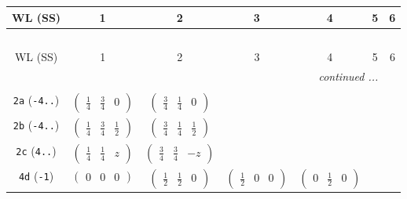 \documentclass[fleqn,9pt,landscape]{jsarticle}
\begin{document}
\begin{center}
\renewcommand{\arraystretch}{1.2}
\begin{longtable}{ccccccc}
 \hline \hline
WL (SS) & 1 & 2 & 3 & 4 & 5 & 6 \\ \hline \endfirsthead

\multicolumn{6}{l}{\tablename\ \thetable{}} \\
 \hline \hline
WL (SS) & 1 & 2 & 3 & 4 & 5 & 6 \\ \hline \endhead

 \hline \hline
\multicolumn{6}{r}{\footnotesize\it continued ...} \\ \endfoot

 \hline \hline
\multicolumn{6}{r}{} \\ \endlastfoot

{\tt 2a} ({\tt -4..}) & $ \begin{pmatrix} \frac{1}{4} & \frac{3}{4} & 0 \end{pmatrix} $ & $ \begin{pmatrix} \frac{3}{4} & \frac{1}{4} & 0 \end{pmatrix} $ & $  $ & $  $ & $  $ & $  $ \\ \hline
{\tt 2b} ({\tt -4..}) & $ \begin{pmatrix} \frac{1}{4} & \frac{3}{4} & \frac{1}{2} \end{pmatrix} $ & $ \begin{pmatrix} \frac{3}{4} & \frac{1}{4} & \frac{1}{2} \end{pmatrix} $ & $  $ & $  $ & $  $ & $  $ \\ \hline
{\tt 2c} ({\tt 4..}) & $ \begin{pmatrix} \frac{1}{4} & \frac{1}{4} & z \end{pmatrix} $ & $ \begin{pmatrix} \frac{3}{4} & \frac{3}{4} & - z \end{pmatrix} $ & $  $ & $  $ & $  $ & $  $ \\ \hline
{\tt 4d} ({\tt -1}) & $ \begin{pmatrix} 0 & 0 & 0 \end{pmatrix} $ & $ \begin{pmatrix} \frac{1}{2} & \frac{1}{2} & 0 \end{pmatrix} $ & $ \begin{pmatrix} \frac{1}{2} & 0 & 0 \end{pmatrix} $ & $ \begin{pmatrix} 0 & \frac{1}{2} & 0 \end{pmatrix} $ & $  $ & $  $ \\ \hline

\end{longtable}
\end{center}
\end{document}
